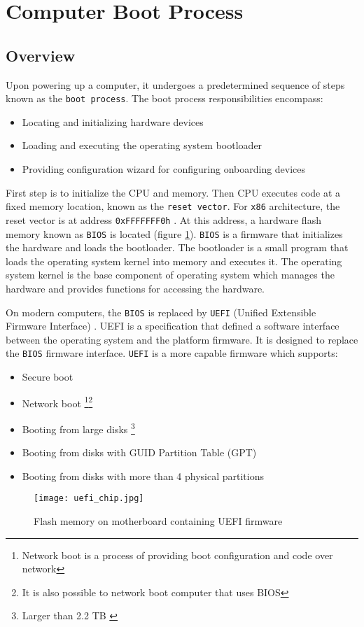 \documentclass[../main.tex]{subfiles}
\begin{document}
\section{Computer Boot Process}
\label{sec:computer-boot-process}

\subsection{Overview}

Upon powering up a computer, it undergoes a predetermined sequence of steps known as the \texttt{boot process}.
The boot process responsibilities encompass:
\begin{itemize}
  \item Locating and initializing hardware devices
  \item Loading and executing the operating system bootloader
  \item Providing configuration wizard for configuring onboarding devices
\end{itemize}

First step is to initialize the CPU and memory. Then CPU executes
code at a fixed memory location, known as the \texttt{reset vector}.
For \texttt{x86} architecture, the reset vector is at address \texttt{0xFFFFFFF0h} \cite{resetvector}.
At this address, a hardware flash memory known as \texttt{BIOS} is located (figure \ref{fig:uefi_chip}). \texttt{BIOS} is a firmware
that initializes the hardware and loads the bootloader. The bootloader is a small program that
loads the operating system kernel into memory and executes it. The operating system kernel
is the base component of operating system which manages the hardware and provides functions for
accessing the hardware.

On modern computers, the \texttt{BIOS} is replaced by \texttt{UEFI} (Unified Extensible Firmware Interface) \cite{uefi_spec}.
UEFI is a specification that defined a software interface between the operating system and the platform firmware.
It is designed to replace the \texttt{BIOS} firmware interface. \texttt{UEFI} is a more capable firmware which supports:
\begin{itemize}
  \item Secure boot
  \item Network boot \footnote{Network boot is a process of providing boot configuration and code over network}\footnote{It is also possible to network boot computer that uses BIOS}
  \item Booting from large disks \footnote{Larger than 2.2 TB \cite{bios_limits}}
  \item Booting from disks with GUID Partition Table (GPT)
  \item Booting from disks with more than 4 physical partitions
\end{itemize}

\begin{figure}[H]
  \centering
  \texttt{[image: uefi\_chip.jpg]}
  \caption{Flash memory on motherboard containing UEFI firmware \cite{uefi_chip_img_ref}}
  \label{fig:uefi_chip}
\end{figure}
\end{document}
